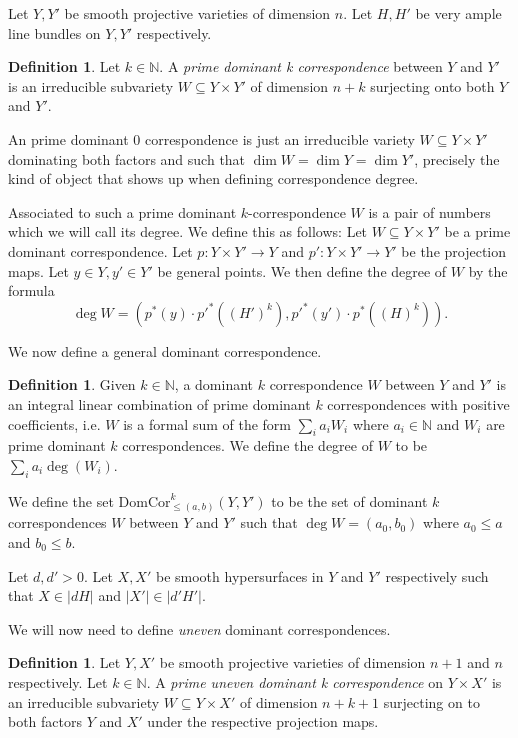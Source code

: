 \documentclass[12pt]{amsart}
\numberwithin{equation}{section}
\numberwithin{theorem}{section}
\theoremstyle{definition}
\theoremstyle{definition}
\newtheorem{definition}[theorem]{Definition}
\def\NN{{\mathbb N}}
\def \DC{{\mathrm{DomCor}}}
\begin{document}
Let $Y, Y'$ be smooth projective varieties of dimension $n$. Let $H, H'$ be very ample line bundles on $Y, Y'$ respectively.



\begin{definition}
    Let $k \in \NN$.
    A \emph{prime dominant k correspondence} between $Y$ and $Y'$ is an irreducible subvariety $W \subseteq Y \times Y'$ of dimension $n +k$ surjecting onto both $Y$ and $Y'$.
\end{definition}

An prime dominant $0$ correspondence is just an irreducible variety $W \subseteq Y \times Y'$ dominating both factors and such that $\dim W = \dim Y = \dim Y'$, precisely the kind of object that shows up when defining correspondence degree.

Associated to such a prime dominant $k$-correspondence $W$ is a pair of numbers which we will call its degree. We define this as follows: Let $W \subseteq Y \times Y'$ be a prime dominant correspondence.  Let $p : Y \times Y' \to Y$ and $p' : Y \times Y' \to Y'$ be the projection maps. Let $y \in Y, y' \in Y'$ be  general points. 
We then define the degree of $W$ by the formula  $$  \deg W = ( p^*(y) \cdot p'^{*}((H')^k), p'^*(y') \cdot p^{*}((H)^k)).$$  

We now define a general dominant correspondence.
\begin{definition}
    Given $k \in \NN$,
    a dominant $ k$ correspondence $W$ between $Y$ and $Y'$ is an integral linear combination of prime dominant $k$ correspondences with positive coefficients, i.e. $W$ is a  formal sum of the form $\sum_i a_i W_i$ where $a_i \in \NN$ and $W_i$ are prime dominant $k$ correspondences. We define the degree of $W$ to be $\sum_i a_i \deg(W_i).$

    We define the set $\DC^k _{\le (a,b)} (Y, Y')$ to be the set of dominant $k$ correspondences $W$ between $Y$ and $Y'$ such that $\deg W = (a_0,b_0)$ where $a_0 \le a$ and $b_0 \le b$.
\end{definition}






Let $d, d' >0$. Let $X, X'$ be smooth  hypersurfaces in $Y$ and $Y'$ respectively such that $X\in |d H|$ and $|X'| \in |d' H'|.$

We will now need to define \emph{uneven} dominant correspondences. 

\begin{definition}
    Let $ Y, X'$ be smooth projective varieties of dimension $n+1$ and $n$ respectively. 
    Let $k \in \NN$.
    A \emph{prime uneven dominant k correspondence} on $Y \times X'$ is an irreducible subvariety $W \subseteq Y \times X'$ of dimension $n+k+1$ surjecting on to both factors $Y$ and $X'$ under the respective projection maps.     
\end{definition}
\end{document}

